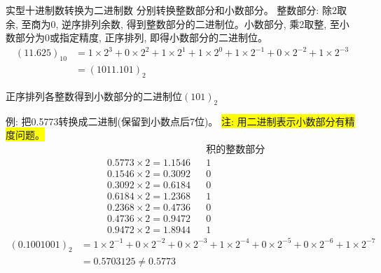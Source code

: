 


\begin{frame}{实型十进制数转换为二进制数}
分别转换整数部分和小数部分。 整数部分: 除2取余, 至商为0, 逆序排列余数, 得到整数部分的二进制位。小数部分, 乘2取整, 至小数部分为0或指定精度, 正序排列, 即得小数部分的二进制位。
\begin{align*}
(11.625)_{10}&=1\times 2^3+0\times 2^2+1\times 2^1+1\times 2^0+1\times 2^{-1}+0\times 2^{-2}+1\times 2^{-3}\\
&=(1011.101)_2
\end{align*}

\begin{center}
\qquad\qquad {}\qquad\qquad {}
	
正序排列各整数得到小数部分的二进制位$(101)_2$
\end{center}
	
\end{frame}

\begin{frame}[shrink]{例: 把0.5773转换成二进制(保留到小数点后7位)。}
\colorbox{yellow}{注: 用二进制表示小数部分有精度问题。}
\begin{align*}
&                      &&\text{积的整数部分}\\
&0.5773\times 2=1.1546 && 1\\
&0.1546\times 2=0.3092 && 0\\
&0.3092\times 2=0.6184 && 0\\
&0.6184\times 2=1.2368 && 1\\
&0.2368\times 2=0.4736 && 0\\
&0.4736\times 2=0.9472 && 0\\
&0.9472\times 2=1.8944 && 1
\end{align*}
\begin{align*}
(0.1001001)_2&=1\times 2^{-1}+0\times 2^{-2}+0\times 2^{-3}+1\times 2^{-4}+0\times 2^{-5}+0\times 2^{-6}+1\times 2^{-7}\\
&=0.5703125\ne 0.5773   
\end{align*}
\end{frame}

